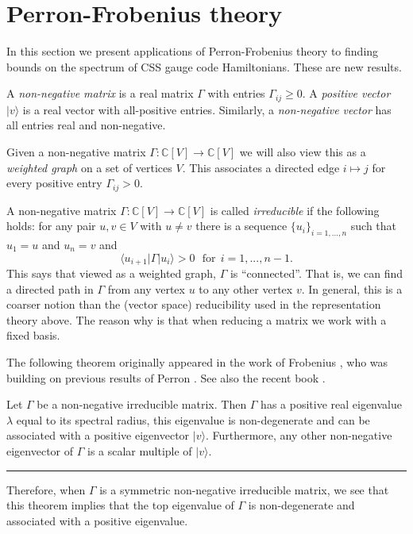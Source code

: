 \documentclass[11pt,oneside]{article}
\def\Complex{\mathbb{C}}
\newcommand{\ket}[1]{|{#1}\rangle}
\newcommand{\bra}[1]{\langle{#1}|}
\newcommand\dotheorem[1]{\vskip 5pt \noindent {\bf \underline{Theorem #1.}\ }}
\newcommand\tombstone{\rule{.36em}{2ex}\vskip 5pt}
\begin{document}
%

\section{Perron-Frobenius theory}

In this section we present 
applications of Perron-Frobenius theory to finding bounds on the spectrum of
CSS gauge code Hamiltonians. These are new results.

A \emph{non-negative matrix} is a real matrix
$\Gamma$ with entries $\Gamma_{ij}\ge 0.$
A \emph{positive vector} $\ket{v}$ is a real vector 
with all-positive entries. Similarly, a \emph{non-negative vector}
has all entries real and non-negative.

Given a non-negative matrix 
$\Gamma : \Complex[V] \to \Complex[V]$
we will also view this as a \emph{weighted graph} on a set of vertices $V.$
This associates a directed edge $i\mapsto j$ for every positive
entry $\Gamma_{ij}>0.$

A non-negative matrix 
$\Gamma : \Complex[V] \to \Complex[V]$
is called \emph{irreducible} if the following holds:
for any pair $u, v\in V$ with $u\ne v$ there is
a sequence $\{u_i \}_{i=1,...,n}$ such that $u_1=u$
and $u_n=v$ and
$$
    \bra{u_{i+1}}\Gamma\ket{u_i} > 0\ \ \ \mbox{for}\ \ i=1,...,n-1.
$$
This says that viewed as a weighted graph, $\Gamma$ is ``connected''.
That is, we can find a directed path in $\Gamma$
from any vertex $u$ to any other vertex $v$.
In general, this is a coarser notion than
the (vector space) reducibility used in the representation theory above.
The reason why is that when reducing a matrix we work
with a fixed basis.

The following theorem originally appeared
in the work of Frobenius \cite{Frobenius1912}, who
was building on previous results of Perron \cite{Perron1907}.
See also the recent book \cite{Baez2012}.

\dotheorem{(Perron-Frobenius)}
Let $\Gamma$ be a non-negative irreducible matrix.
Then $\Gamma$ has a positive real eigenvalue
$\lambda$ equal to its spectral radius,
this eigenvalue is non-degenerate and can be associated 
with a positive eigenvector $\ket{v}$.
Furthermore, any other non-negative eigenvector of 
$\Gamma$ is a scalar multiple of $\ket{v}.$
\tombstone

Therefore, when $\Gamma$ is a symmetric non-negative irreducible matrix,
we see that this theorem implies that the top eigenvalue of $\Gamma$ is
non-degenerate and associated with a positive eigenvalue.
\end{document}
